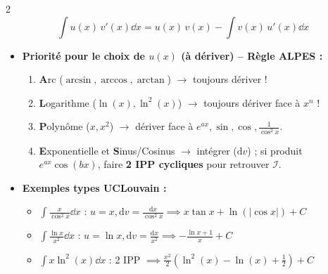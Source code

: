 {\begin{multicols}{2}
\[
    \boxed{\int u(x)\,v'(x)\dd x = u(x)\,v(x) - \int v(x)\,u'(x)\dd x}
\]
\begin{itemize}[leftmargin=1.2em, itemsep=1.5pt, topsep=2pt]
    \item \textbf{Priorité pour le choix de $u(x)$ (à dériver) -- Règle ALPES :}
    \begin{enumerate}[leftmargin=1.4em, itemsep=1pt, topsep=1pt]
        \item \textbf{A}rc ($\arcsin, \arccos, \arctan$) $\to$ toujours dériver !
        \item \textbf{L}ogarithme ($\ln(x), \ln^2(x)$) $\to$ toujours dériver face à $x^n$ !
        \item \textbf{P}olynôme ($x, x^2$) $\to$ dériver face à $e^{ax}, \sin, \cos, \frac{1}{\cos^2 x}$.
        \item \textbf{E}xponentielle et \textbf{S}inus/Cosinus $\to$ intégrer ($\mathrm{d}v$) ; si produit $e^{ax}\cos(bx)$, faire \textbf{2 IPP cycliques} pour retrouver $\mathcal{I}$.
    \end{enumerate}
    \item \textbf{Exemples types UCLouvain :}
    \begin{itemize}[leftmargin=1em, itemsep=1pt, topsep=1pt]
        \item $\int \frac{x}{\cos^2 x}\dd x$ : $u=x, \mathrm{d}v=\frac{\mathrm{d}x}{\cos^2 x} \implies x\tan x + \ln(|\cos x|) + C$
        \item $\int \frac{\ln x}{x^2}\dd x$ : $u=\ln x, \mathrm{d}v=\frac{\mathrm{d}x}{x^2} \implies -\frac{\ln x + 1}{x} + C$
        \item $\int x\ln^2(x)\dd x$ : 2 IPP $\implies \frac{x^2}{2}\left(\ln^2(x) - \ln(x) + \frac{1}{2}\right) + C$
    \end{itemize}
\end{itemize}


\end{multicols}}
